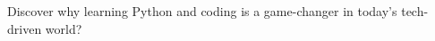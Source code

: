 \documentclass[preview]{standalone}
\begin{document}
\begin{center}
Discover why learning Python and coding is a game-changer in today's tech-driven world?
\end{center}
\end{document}
